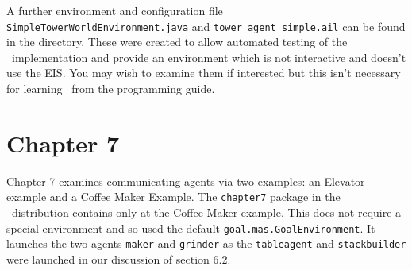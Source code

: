 \documentclass[a4]{article}
\begin{document}
\begin{sloppypar}
  A further environment and configuration file \texttt{SimpleTowerWorldEnvironment.java} and \texttt{tower\_agent\_simple.ail} can be found in the directory.  These were created to allow automated testing of the \goal\ implementation and provide an environment which is not interactive and doesn't use the EIS.  You may wish to examine them if interested but this isn't necessary for learning \goal\ from the programming guide.
  \end{sloppypar}

\section{Chapter 7}

Chapter 7 examines communicating agents via two examples: an Elevator example and a Coffee Maker Example.  The \texttt{chapter7} package in the \ail\ distribution contains only at the Coffee Maker example.  This does not require a special environment and so used the default \texttt{goal.mas.GoalEnvironment}.  It launches the two agents \texttt{maker} and \texttt{grinder} as the \texttt{tableagent} and \texttt{stackbuilder} were launched in our discussion of section 6.2.
\end{document}
